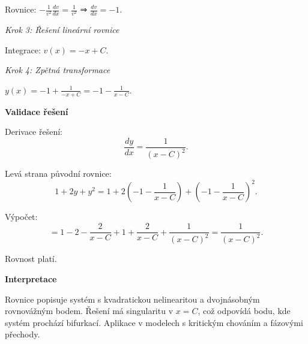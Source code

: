 \begin{example}
Rovnice: $-\frac{1}{v^2}\frac{dv}{dx} = \frac{1}{v^2}$ ⇒ $\frac{dv}{dx} = -1$.

\noindent\textit{Krok 3: Řešení lineární rovnice}

Integrace: $v(x) = -x + C$.

\noindent\textit{Krok 4: Zpětná transformace}

$y(x) = -1 + \frac{1}{-x + C} = -1 - \frac{1}{x - C}$.

\vspace{1.5\baselineskip}

\noindent\textbf{Validace řešení}

Derivace řešení:
\[
\frac{dy}{dx} = \frac{1}{(x - C)^2}.
\]

Levá strana původní rovnice:
\[
1 + 2y + y^2 = 1 + 2\left(-1 - \frac{1}{x-C}\right) + \left(-1 - \frac{1}{x-C}\right)^2.
\]

Výpočet:
\[
= 1 - 2 - \frac{2}{x-C} + 1 + \frac{2}{x-C} + \frac{1}{(x-C)^2} = \frac{1}{(x-C)^2}.
\]

Rovnost platí.

\vspace{1.5\baselineskip}

\noindent\textbf{Interpretace}

Rovnice popisuje systém s kvadratickou nelinearitou a dvojnásobným rovnovážným bodem. 
Řešení má singularitu v $x = C$, což odpovídá bodu, kde systém prochází bifurkací. 
Aplikace v modelech s kritickým chováním a fázovými přechody.

\end{example}

\vspace{2\baselineskip}

